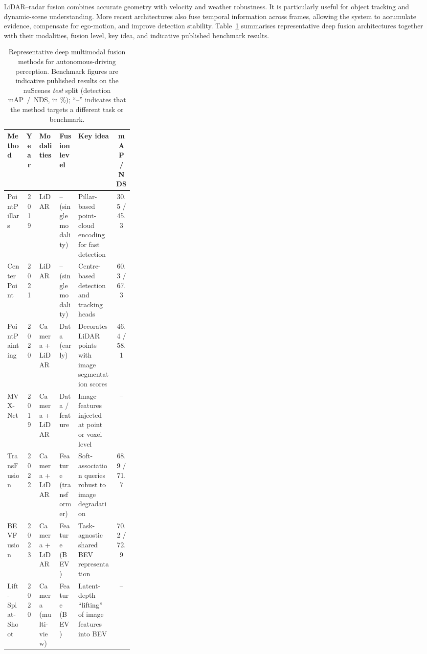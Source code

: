 \documentclass[11pt,oneside,openany]{book}
\newcommand{\added}[1]{\textcolor{RevisionBlue}{#1}}
\begin{document}
LiDAR--radar fusion combines accurate geometry with velocity and weather robustness. It is particularly useful for object tracking and dynamic-scene understanding. More recent architectures also fuse temporal information across frames, allowing the system to accumulate evidence, compensate for ego-motion, and improve detection stability. \added{Table~\ref{tab:deep-fusion-methods} summarises representative deep fusion architectures together with their modalities, fusion level, key idea, and indicative published benchmark results.}

\begin{table}[!t]
    \centering
    \color{blue}
    \small
    \setlength{\tabcolsep}{4pt}
    \caption{\color{blue}Representative deep multimodal fusion methods for autonomous-driving perception. Benchmark figures are indicative published results on the nuScenes \emph{test} split (detection mAP~/~NDS, in \%); ``--'' indicates that the method targets a different task or benchmark.}
    \label{tab:deep-fusion-methods}
    \begin{tabular}{l c l l p{0.30\linewidth} c}
        \hline
        \textbf{Method} & \textbf{Year} & \textbf{Modalities} & \textbf{Fusion level} & \textbf{Key idea} & \textbf{mAP / NDS} \\
        \hline
        PointPillars \cite{lang2019_pointpillars} & 2019 & LiDAR & -- (single modality) & Pillar-based point-cloud encoding for fast detection & 30.5 / 45.3 \\
        CenterPoint \cite{yin2021_centerpoint} & 2021 & LiDAR & -- (single modality) & Centre-based detection and tracking heads & 60.3 / 67.3 \\
        PointPainting \cite{vora2020_pointpainting} & 2020 & Camera + LiDAR & Data (early) & Decorates LiDAR points with image segmentation scores & 46.4 / 58.1 \\
        MVX-Net \cite{sindagi2019_mvxnet} & 2019 & Camera + LiDAR & Data / feature & Image features injected at point or voxel level & -- \\
        TransFusion \cite{bai2022_transfusion} & 2022 & Camera + LiDAR & Feature (transformer) & Soft-association queries robust to image degradation & 68.9 / 71.7 \\
        BEVFusion \cite{liu2023_bevfusion} & 2023 & Camera + LiDAR & Feature (BEV) & Task-agnostic shared BEV representation & 70.2 / 72.9 \\
        Lift-Splat-Shoot \cite{philion2020_lss} & 2020 & Camera (multi-view) & Feature (BEV) & Latent-depth ``lifting'' of image features into BEV & -- \\

\end{tabular}
\end{table}
\end{document}
